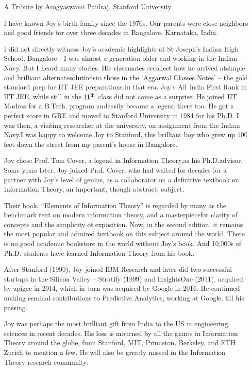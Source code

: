 \begin{multicols}{2}
A Tribute by Arogyaswami Paulraj, Stanford University

I have known Joy’s birth family since the 1970s. Our parents were close neighbors and good friends for over three decades in Bangalore, Karnataka, India.

I did not directly witness Joy’s academic highlights at St Joseph’s Indian High School, Bangalore - I was almost a generation older and working in the Indian Navy. But I heard many stories.  His classmates recollect how he arrived atsimple and brilliant alternatesolutionsto those in the ‘Aggarwal Classes Notes’ – the gold standard prep for IIT JEE preparations in that era. Joy’s All India First Rank in IIT JEE, while still in the $11^{\rm th}$ class did not come as a surprise. He joined IIT Madras for a B.Tech. program andeasily became a legend there too. He got a perfect score in GRE and moved to Stanford University in 1984 for his Ph.D. I was then, a visiting researcher at the university, on assignment from the Indian Navy.I was happy to welcome Joy to Stanford, this brilliant boy who grew up 100 feet down the street from my parent’s house in Bangalore.

Joy chose Prof. Tom Cover, a legend in Information Theory,as his Ph.D.advisor. Some years later, Joy joined Prof. Cover, who had waited for decades for a partner with Joy’s level of genius, as a collaborator on a definitive textbook on Information Theory, an important, though abstract, subject.

Their book, “Elements of Information Theory” is regarded by many as the benchmark text on modern information theory, and a masterpiecefor clarity of concepts and the simplicity of exposition. Now, in the second edition, it remains the most popular and admired textbook on this subject around the world. There is no good academic bookstore in the world without Joy’s book. And 10,000s of Ph.D. students have learned Information Theory from his book.

After Stanford (1990), Joy joined IBM Research and later did two successful startups in the Silicon Valley – Stratify (1999) and InsightsOne (2011), acquired by apigee in 2014, which in turn was acquired by Google in 2016. He continued making seminal contributions to Predictive Analytics, working at Google, till his passing.

Joy was perhaps the most brilliant gift from India to the US in engineering sciences in recent decades. His loss is mourned by all the giants in Information Theory around the globe, from Stanford, MIT, Princeton, Berkeley, and ETH Zurich to mention a few. He will also be greatly missed in the Information Theory research community.


\end{multicols}
